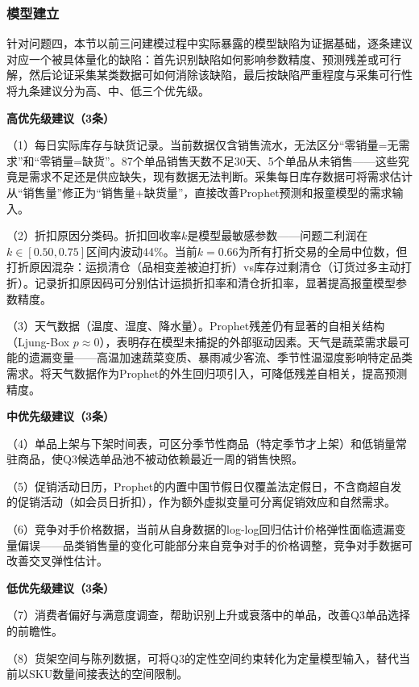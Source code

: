 
\subsubsection{模型建立}

针对问题四，本节以前三问建模过程中实际暴露的模型缺陷为证据基础，逐条建议对应一个被具体量化的缺陷：首先识别缺陷如何影响参数精度、预测残差或可行解，然后论证采集某类数据可如何消除该缺陷，最后按缺陷严重程度与采集可行性将九条建议分为高、中、低三个优先级。

\textbf{高优先级建议（3条）}

（1）每日实际库存与缺货记录。当前数据仅含销售流水，无法区分“零销量=无需求”和“零销量=缺货”。87个单品销售天数不足30天、5个单品从未销售——这些究竟是需求不足还是供应缺失，现有数据无法判断。采集每日库存数据可将需求估计从“销售量”修正为“销售量+缺货量”，直接改善Prophet预测和报童模型的需求输入。

（2）折扣原因分类码。折扣回收率$k$是模型最敏感参数——问题二利润在$k\in[0.50,0.75]$区间内波动44\%。当前$k=0.66$为所有打折交易的全局中位数，但打折原因混杂：运损清仓（品相变差被迫打折）vs库存过剩清仓（订货过多主动打折）。记录折扣原因码可分别估计运损折扣率和清仓折扣率，显著提高报童模型参数精度。

（3）天气数据（温度、湿度、降水量）。Prophet残差仍有显著的自相关结构（Ljung-Box $p\approx 0$），表明存在模型未捕捉的外部驱动因素。天气是蔬菜需求最可能的遗漏变量——高温加速蔬菜变质、暴雨减少客流、季节性温湿度影响特定品类需求。将天气数据作为Prophet的外生回归项引入，可降低残差自相关，提高预测精度。

\textbf{中优先级建议（3条）}

（4）单品上架与下架时间表，可区分季节性商品（特定季节才上架）和低销量常驻商品，使Q3候选单品池不被动依赖最近一周的销售快照。

（5）促销活动日历，Prophet的内置中国节假日仅覆盖法定假日，不含商超自发的促销活动（如会员日折扣），作为额外虚拟变量可分离促销效应和自然需求。

（6）竞争对手价格数据，当前从自身数据的log-log回归估计价格弹性面临遗漏变量偏误——品类销售量的变化可能部分来自竞争对手的价格调整，竞争对手数据可改善交叉弹性估计。

\textbf{低优先级建议（3条）}

（7）消费者偏好与满意度调查，帮助识别上升或衰落中的单品，改善Q3单品选择的前瞻性。

（8）货架空间与陈列数据，可将Q3的定性空间约束转化为定量模型输入，替代当前以SKU数量间接表达的空间限制。

